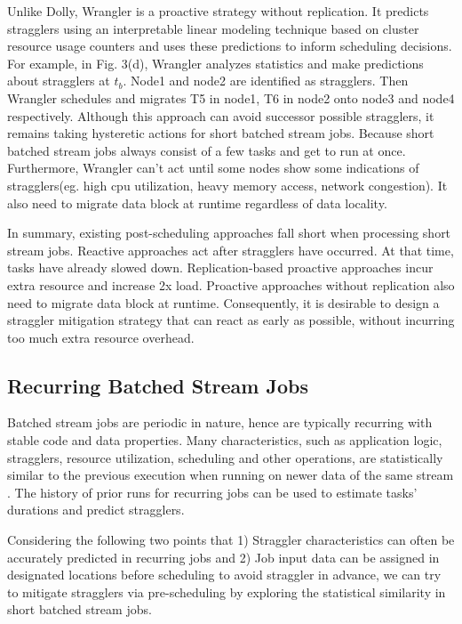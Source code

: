 \documentclass[10pt,conference,compsocconf,letterpaper]{IEEEtran}
\begin{document}
  Unlike Dolly, Wrangler \cite{Yadwadkar2014} is a proactive strategy without replication. It predicts stragglers using an interpretable linear modeling technique based on cluster resource usage counters and uses these predictions to inform scheduling decisions. For example, in Fig. 3(d), Wrangler analyzes statistics and make predictions about stragglers at $t_b$. Node1 and node2 are identified as stragglers. Then Wrangler schedules and migrates T5 in node1, T6 in node2 onto node3 and node4 respectively. Although this approach can avoid successor possible stragglers, it remains taking hysteretic actions for short batched stream jobs. Because short batched stream jobs always consist of a few tasks and get to run at once. Furthermore, Wrangler can't act until some nodes show some indications of stragglers(eg. high cpu utilization, heavy memory access, network congestion). It also need to migrate data block at runtime regardless of data locality.

  In summary, existing post-scheduling approaches fall short when processing short stream jobs. Reactive approaches act after stragglers have occurred. At that time, tasks have already slowed down. Replication-based proactive approaches incur extra resource and increase 2x load. Proactive approaches without replication also need to migrate data block at runtime. Consequently, it is desirable to design a straggler mitigation strategy that can react as early as possible, without incurring too much extra resource overhead.

\subsection{Recurring Batched Stream Jobs}

  Batched stream jobs are periodic in nature, hence are typically recurring with stable code and data properties. Many characteristics, such as application logic, stragglers, resource utilization, scheduling and other operations, are statistically similar to the previous execution when running on newer data of the same stream \cite{Agarwal} \cite{Grandl2016} \cite{Jyothi2016}. The history of prior runs for recurring jobs can be used to estimate tasks' durations and predict stragglers.

  Considering the following two points that 1) Straggler characteristics can often be accurately predicted in recurring jobs and 2) Job input data can be assigned in designated locations before scheduling to avoid straggler in advance, we can try to mitigate stragglers via pre-scheduling by exploring the statistical similarity in short batched stream jobs.
\end{document}
